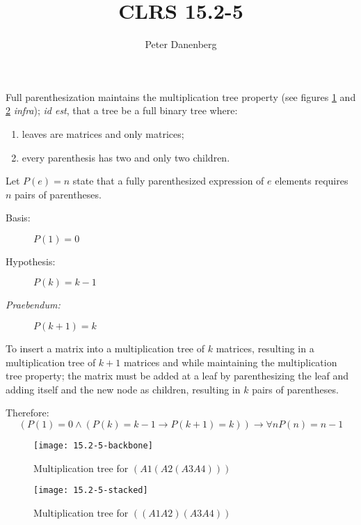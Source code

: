 \documentclass{article}
\title{CLRS 15.2-5}
\author{Peter Danenberg}
\begin{document}
\maketitle

Full parenthesization maintains the multiplication tree property (see
figures \ref{fig:backbone} and \ref{fig:stacked} \emph{infra});
\emph{id est}, that a tree be a full binary tree where:

\begin{enumerate}
\item leaves are matrices and only matrices;
\item every parenthesis has two and only two children.
\end{enumerate}

Let $P(e) = n$ state that a fully parenthesized expression of $e$
elements requires $n$ pairs of parentheses.

\begin{description}
  \item[Basis:] $P(1) = 0$
  \item[Hypothesis:] $P(k) = k-1$
  \item[\emph{Praebendum:}] $P(k + 1) = k$
\end{description}

To insert a matrix into a multiplication tree of $k$ matrices,
resulting in a multiplication tree of $k+1$ matrices and while
maintaining the multiplication tree property; the matrix must be added
at a leaf by parenthesizing the leaf and adding itself and the new
node as children, resulting in $k$ pairs of parentheses.

Therefore:
\[(P(1)=0 \wedge (P(k)=k-1 \to P(k+1)=k)) \to \forall nP(n)=n-1\]

\begin{figure}[ht]
  \centering
  \texttt{[image: 15.2-5-backbone]}
  \caption{Multiplication tree for $(A1 (A2 (A3 A4)))$}
  \label{fig:backbone}
\end{figure}

\begin{figure}[ht]
  \centering
  \texttt{[image: 15.2-5-stacked]}
  \caption{Multiplication tree for $((A1 A2)(A3 A4))$}
  \label{fig:stacked}
\end{figure}
\end{document}

